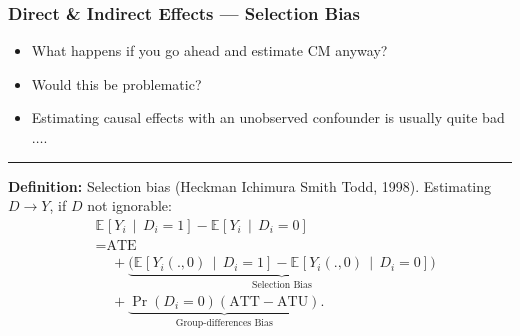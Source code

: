 \documentclass[dvipsnames,handout]{beamer} %
\newcommand{\Prob}[1]{\Pr\left( #1 \right)}                         %
\newcommand{\Egiven}[3][]{\mathbb{E}_{#1} \left[ #2 \, \middle\vert \, #3 \right]} %
\begin{document}
\begin{frame}[noframenumbering]
    \frametitle{Direct \& Indirect Effects --- Selection Bias}
    \begin{itemize}
        \item What happens if you go ahead and estimate CM anyway?
        \item Would this be problematic?
        \item Estimating causal effects with an unobserved confounder is usually quite bad$\hdots$.
    \end{itemize}
    \par\noindent\rule{\textwidth}{0.4pt}
    \vskip0.25cm
    \textbf{Definition:} Selection bias (Heckman Ichimura Smith Todd, 1998).
    \vskip0.25cm
    Estimating $D \to Y$, if $D$ not ignorable:
    \begin{align*}
        &\Egiven{ Y_i}{D_i =1} - \Egiven{ Y_i}{D_i =0} \\
        &= \text{ATE} \\
        &\;\;\;\; + \underbrace{\Big(
            \Egiven{ Y_i(., 0)}{D_i =1} - \Egiven{ Y_i(.,0)}{D_i =0} \Big)}_{
                \text{Selection Bias}} \\
        &\;\;\;\;+ \underbrace{ \Prob{D_i=0} (\text{ATT}- \text{ATU}) }_{
            \text{Group-differences Bias}}.
    \end{align*}
\end{frame}
\end{document}

